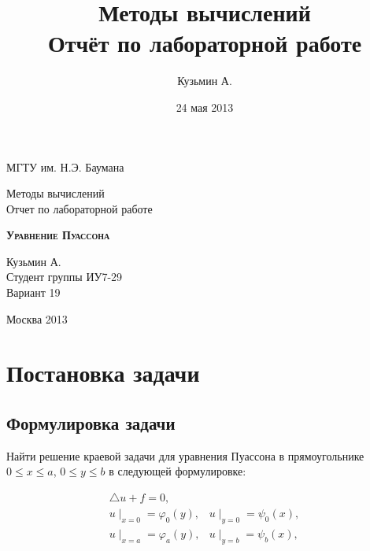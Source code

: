 \documentclass[a4paper,12pt]{article}
\title{ Методы вычислений \\Отчёт по лабораторной работе \textnumero 3 \\  }
\author{Кузьмин А.}
\date{24 мая 2013}
\begin{document}

\begin{titlepage}
\newpage
\begin{center}
МГТУ им. Н.Э. Баумана \\		%
\hrulefill %
\end{center}

\vspace{10em}
\begin{center}
\Large Методы вычислений \\
\vspace{1em}
Отчет по лабораторной работе 
\end{center}


\begin{center}
\textsc{\textbf{Уравнение Пуассона}}
\end{center}

\vspace{15em}
\begin{flushright}
Кузьмин А. \\
Студент группы ИУ7-29 \\
Вариант 19
\end{flushright}
\vspace{\fill}
\begin{center}
Москва 2013
\end{center}
\end{titlepage}


\newpage

\section{Постановка задачи}
\subsection{Формулировка задачи}

Найти решение краевой задачи для уравнения Пуассона в прямоугольнике $0 \le x \le a$, $0 \le y \le b$ в следующей формулировке:

\[
\begin{array}{ll}
\bigtriangleup u + f = 0, \\
u \mid_{x=0} = \varphi_0(y), & u \mid_{y=0} = \psi_0(x), \\
u \mid_{x=a} = \varphi_a(y), & u \mid_{y=b} = \psi_b(x), \\
\end{array}
\]
\end{document}
